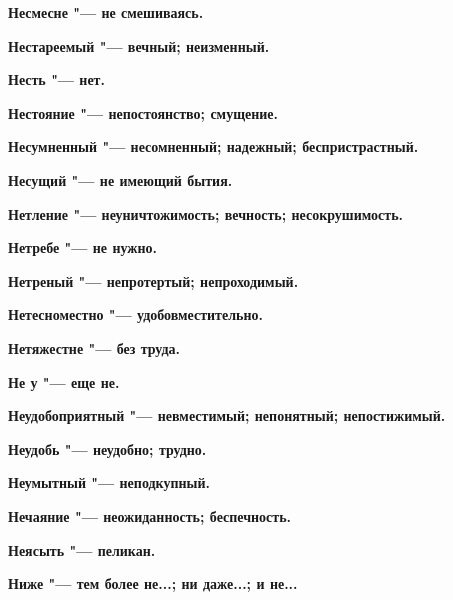 \bfseries Несмесне \normalfont{} "--- не смешиваясь. 




\bfseries Нестареемый \normalfont{} "--- вечный; неизменный. 




\bfseries Несть \normalfont{} "--- нет. 




\bfseries Нестояние \normalfont{} "--- непостоянство; смущение. 




\bfseries Несумненный \normalfont{} "--- несомненный; надежный; беспристрастный. 




\bfseries Несущий \normalfont{} "--- не имеющий бытия. 




\bfseries Нетление \normalfont{} "--- неуничтожимость; вечность; несокрушимость. 




\bfseries Нетребе \normalfont{} "--- не нужно. 




\bfseries Нетреный \normalfont{} "--- непротертый; непроходимый. 




\bfseries Нетесноместно \normalfont{} "--- удобовместительно. 




\bfseries Нетяжестне \normalfont{} "--- без труда. 




\bfseries Не у \normalfont{} "--- еще не. 




\bfseries Неудобоприятный \normalfont{} "--- невместимый; непонятный; непостижимый. 




\bfseries Неудобь \normalfont{} "--- неудобно; трудно. 




\bfseries Неумытный \normalfont{} "--- неподкупный. 




\bfseries Нечаяние \normalfont{} "--- неожиданность; беспечность. 




\bfseries Неясыть \normalfont{} "--- пеликан. 




\bfseries Ниже \normalfont{} "--- тем более не...; ни даже...; и не... 




